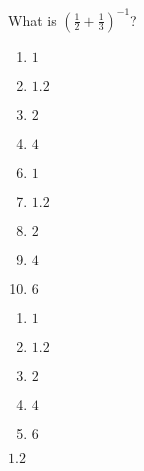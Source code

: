 

  What is $\left(\frac{1}{2}+\frac{1}{3}\right)^{-1}$?


\ifsat
	\begin{enumerate}[label=\Alph*)]
		\item    $1$
		\item  $1.2$ %
		\item $2$ 
		\item $4$ 
	\end{enumerate}
\else
\fi

\ifacteven
	\begin{enumerate}[label=\textbf{\Alph*.},itemsep=\fill,align=left]
		\setcounter{enumii}{5}
		\item    $1$
		\item  $1.2$ %
		\item $2$ 
		\addtocounter{enumii}{1}
		\item $4$ 
		\item  $6$ 
	\end{enumerate}
\else
\fi

\ifactodd
	\begin{enumerate}[label=\textbf{\Alph*.},itemsep=\fill,align=left]
		\item    $1$
		\item  $1.2$ %
		\item $2$ 
		\item $4$ 
		\item  $6$ 
	\end{enumerate}
\else
\fi

\ifgridin
  $1.2$ %
		
\else
\fi

